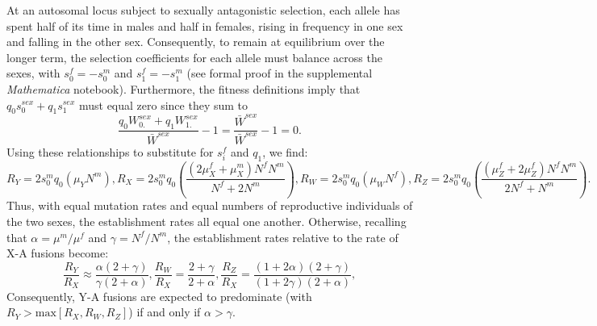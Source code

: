 At an autosomal locus subject to sexually antagonistic selection, each allele has spent half of its time in males and half in females, rising in frequency in one sex and falling in the other sex. Consequently, to remain at equilibrium over the longer term, the selection coefficients for each allele must balance across the sexes, with $s^f_0 = -s^m_0$ and $s^f_\text{1} = -s^m_\text{1}$ (see formal proof in the supplemental \emph{Mathematica} notebook). Furthermore, the fitness definitions imply that $q_0s^{sex}_0 + q_\text{1}s^{sex}_\text{1}$ must equal zero since they sum to
\[\frac{q_0W^{sex}_{0.} + q_\text{1}W^{sex}_{\text{1}.}}{\bar{W}^{sex}} - \text{1} = \frac{\bar{W}^{sex}}{\bar{W}^{sex}} - \text{1} = 0.\]
Using these relationships to substitute for $s^f_i$ and $q_\text{1}$, we find:
\begin{subequations}
\begin{equation}
R_Y = \text{2}s^m_0 q_0 (\mu_YN^m),
\end{equation}
\begin{equation}
R_X = \text{2}s^m_0 q_0 \left(\frac{(\text{2}\mu^f_X + \mu^m_X)N^fN^m}{N^f + \text{2}N^m} \right),
\end{equation}
\begin{equation}
R_W = \text{2}s^m_0 q_0 (\mu_WN^f),
\end{equation}
\begin{equation}
R_Z = \text{2}s^m_0 q_0 \left(\frac{(\mu^f_Z + \text{2}\mu^f_Z)N^fN^m}{\text{2}N^f + N^m} \right).
\end{equation}
\end{subequations}
Thus, with equal mutation rates and equal numbers of reproductive individuals of the two sexes, the establishment rates all equal one another. Otherwise, recalling that $\alpha = \mu^m/\mu^f$ and $\gamma = N^f / N^m$, the establishment rates relative to the rate of X-A fusions become:
\begin{subequations}
\begin{equation}
\frac{R_Y}{R_X} \approx \frac{\alpha(\text{2} + \gamma)}{\gamma(\text{2} + \alpha)},
\end{equation}
\begin{equation}
\frac{R_W}{R_X} = \frac{\text{2} + \gamma}{\text{2} + \alpha},
\end{equation}
\begin{equation}
\frac{R_Z}{R_X} = \frac{(\text{1} + \text{2}\alpha)(\text{2} + \gamma)}{(\text{1} + \text{2}\gamma)(\text{2} + \alpha)},
\end{equation}
\end{subequations}
Consequently, Y-A fusions are expected to predominate (with $R_Y>\text{max}[R_X,R_W,R_Z]$) if and only if $\alpha > \gamma$.
